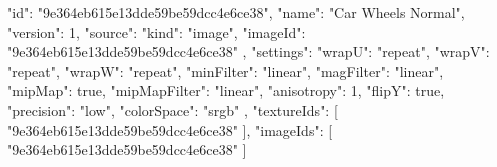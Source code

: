 {
  "id": "9e364eb615e13dde59be59dcc4e6ce38",
  "name": "Car Wheels Normal",
  "version": 1,
  "source": {
    "kind": "image",
    "imageId": "9e364eb615e13dde59be59dcc4e6ce38"
  },
  "settings": {
    "wrapU": "repeat",
    "wrapV": "repeat",
    "wrapW": "repeat",
    "minFilter": "linear",
    "magFilter": "linear",
    "mipMap": true,
    "mipMapFilter": "linear",
    "anisotropy": 1,
    "flipY": true,
    "precision": "low",
    "colorSpace": "srgb"
  },
  "textureIds": [
    "9e364eb615e13dde59be59dcc4e6ce38"
  ],
  "imageIds": [
    "9e364eb615e13dde59be59dcc4e6ce38"
  ]
}
